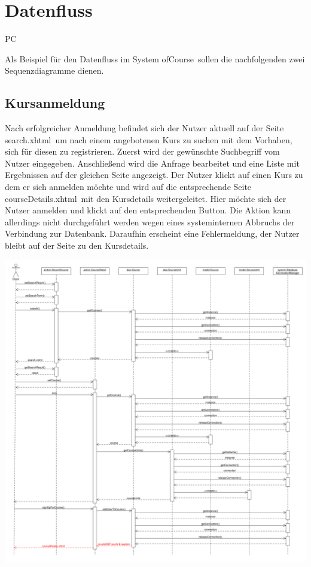 \chapter{Datenfluss}

\begin{tiny}
PC
\end{tiny}

Als Beispiel für den Datenfluss im System \grqq ofCourse\grqq\ sollen die nachfolgenden zwei Sequenzdiagramme dienen.

\section{Kursanmeldung}

Nach erfolgreicher Anmeldung befindet sich der Nutzer aktuell auf der Seite \grqq search.xhtml\grqq\ um nach einem angebotenen Kurs zu suchen mit dem Vorhaben, sich für diesen zu registrieren. Zuerst wird der gewünschte Suchbegriff vom Nutzer eingegeben. Anschließend wird die Anfrage bearbeitet und eine Liste mit Ergebnissen auf der gleichen Seite angezeigt. Der Nutzer klickt auf einen Kurs zu dem er sich anmelden möchte und wird auf die entsprechende Seite \grqq courseDetails.xhtml\grqq\ mit den Kursdetails weitergeleitet. Hier möchte sich der Nutzer anmelden und klickt auf den entsprechenden Button. Die Aktion kann allerdings nicht durchgeführt werden wegen eines systeminternen Abbruchs der Verbindung zur Datenbank. Daraufhin erscheint eine Fehlermeldung, der Nutzer bleibt auf der Seite zu den Kursdetails.

\includegraphics[scale=0.26]{./Grafiken/Sequenzdiagramm-Kursanmeldung.pdf}

